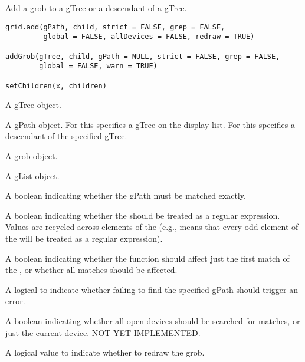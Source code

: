%
\begin{Description}\relax
Add a grob to a gTree or a descendant of a gTree.
\end{Description}
%
\begin{Usage}
\begin{verbatim}
grid.add(gPath, child, strict = FALSE, grep = FALSE,
         global = FALSE, allDevices = FALSE, redraw = TRUE) 

addGrob(gTree, child, gPath = NULL, strict = FALSE, grep = FALSE,
        global = FALSE, warn = TRUE)

setChildren(x, children)
\end{verbatim}
\end{Usage}
%
\begin{Arguments}
\begin{ldescription}
\item[\code{gTree, x}] A gTree object.
\item[\code{gPath}]  A gPath object. For  this
specifies a gTree on the display list.  For  this
specifies a descendant of the specified gTree. 
\item[\code{child}]  A grob object. 
\item[\code{children}]  A gList object. 
\item[\code{strict}]  A boolean indicating whether the gPath must be
matched exactly. 
\item[\code{grep}] A boolean indicating whether the  should
be treated as a regular expression.  Values are recycled across
elements of the  (e.g.,  means
that every odd element of the  will be treated as
a regular expression).

\item[\code{global}]  A boolean indicating whether the function should affect
just the first match of the , or whether all matches
should be affected.

\item[\code{warn}] A logical to indicate whether failing to find the
specified gPath should trigger an error.  
\item[\code{allDevices}]  A boolean indicating whether all open devices
should
be searched for matches, or just the current device.
NOT YET IMPLEMENTED.

\item[\code{redraw}] A logical value to indicate whether to redraw the grob. 
\end{ldescription}
\end{Arguments}
